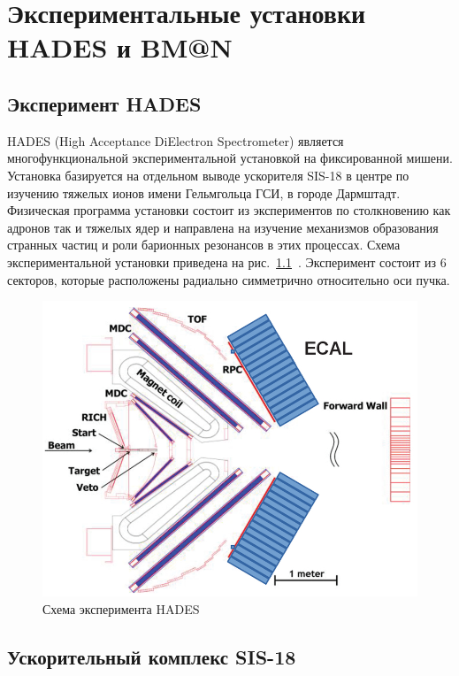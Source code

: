 \chapter{Экспериментальные установки HADES и BM@N} \label{chapt2}

\section{Эксперимент HADES}


HADES (High Acceptance DiElectron Spectrometer) является многофункциональной экспериментальной установкой на фиксированной мишени.
Установка базируется на отдельном выводе ускорителя SIS-18 в центре по изучению тяжелых ионов имени Гельмгольца ГСИ, в городе Дармштадт.
Физическая программа установки состоит из экспериментов по столкновению как адронов так и тяжелых ядер и направлена на изучение механизмов образования странных частиц и роли барионных резонансов в этих процессах. 
Схема экспериментальной установки приведена на рис.~\ref{fig:hades_bmn_layouts}~\cite{HADES:2009aat}.
Эксперимент состоит из 6 секторов, которые расположены радиально симметрично относительно оси пучка.
%
\begin{figure}[ht]
\begin{center}
\includegraphics[width=0.75\linewidth]{images/hades_layout.jpg}
\caption{Схема эксперимента HADES}
\label{fig:hades_bmn_layouts}
\end{center}
\end{figure}

\section{Ускорительный комплекс SIS-18}

